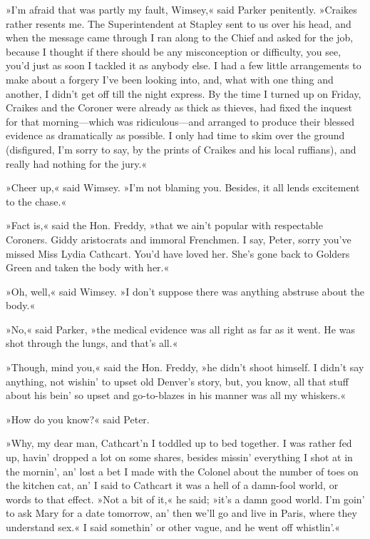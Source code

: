 »I'm afraid that was partly my fault, Wimsey,« said Parker penitently. »Craikes rather resents me. The Superintendent at Stapley sent to us over his head, and when the message came through I ran along to the Chief and asked for the job, because I thought if there should be any misconception or difficulty, you see, you'd just as soon I tackled it as anybody else. I had a few little arrangements to make about a forgery I've been looking into, and, what with one thing and another, I didn't get off till the night express. By the time I turned up on Friday, Craikes and the Coroner were already as thick as thieves, had fixed the inquest for that morning\allowbreak---\allowbreak which was ridiculous\allowbreak---\allowbreak and arranged to produce their blessed evidence as dramatically as possible. I only had time to skim over the ground (disfigured, I'm sorry to say, by the prints of Craikes and his local ruffians), and really had nothing for the jury.«

»Cheer up,« said Wimsey. »I'm not blaming you. Besides, it all lends excitement to the chase.«

»Fact is,« said the Hon. Freddy, »that we ain't popular with respectable Coroners. Giddy aristocrats and immoral Frenchmen. I say, Peter, sorry you've missed Miss Lydia Cathcart. You'd have loved her. She's gone back to Golders Green and taken the body with her.«

»Oh, well,« said Wimsey. »I don't suppose there was anything abstruse about the body.«

»No,« said Parker, »the medical evidence was all right as far as it went. He was shot through the lungs, and that's all.«

»Though, mind you,« said the Hon. Freddy, »he didn't shoot himself. I didn't say anything, not wishin' to upset old Denver's story, but, you know, all that stuff about his bein' so upset and go-to-blazes in his manner was all my whiskers.«

»How do you know?« said Peter.

»Why, my dear man, Cathcart'n I toddled up to bed together. I was rather fed up, havin' dropped a lot on some shares, besides missin' everything I shot at in the mornin', an' lost a bet I made with the Colonel about the number of toes on the kitchen cat, an' I said to Cathcart it was a hell of a damn-fool world, or words to that effect. »Not a bit of it,« he said; »it's a damn good world. I'm goin' to ask Mary for a date tomorrow, an' then we'll go and live in Paris, where they understand sex.« I said somethin' or other vague, and he went off whistlin'.«


